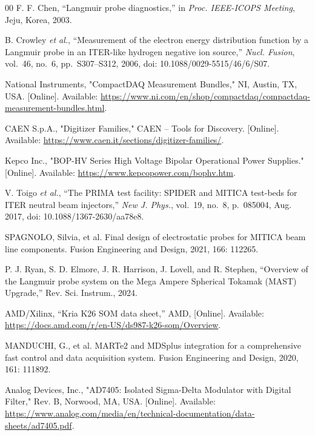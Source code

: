 \begin{thebibliography}{00}
	 F. F. Chen, ``Langmuir probe diagnostics,'' in \textit{Proc. IEEE-ICOPS Meeting}, Jeju, Korea, 2003.
	
	 B. Crowley \textit{et al.}, ``Measurement of the electron energy distribution function by a Langmuir probe in an ITER-like hydrogen negative ion source,'' \textit{Nucl. Fusion}, vol.~46, no.~6, pp.~S307--S312, 2006, doi: 10.1088/0029-5515/46/6/S07.
	
	 National Instruments, "CompactDAQ Measurement Bundles," NI, Austin, TX, USA. [Online]. Available: \url{https://www.ni.com/en/shop/compactdaq/compactdaq-measurement-bundles.html}.
	
	 CAEN S.p.A., "Digitizer Families," CAEN – Tools for Discovery. [Online]. Available: \url{https://www.caen.it/sections/digitizer-families/}. 
	
	 Kepco Inc., "BOP-HV Series High Voltage Bipolar Operational Power Supplies." [Online]. Available: \url{https://www.kepcopower.com/bophv.htm}. 
	
	 V. Toigo \textit{et al.}, ``The PRIMA test facility: SPIDER and MITICA test-beds for ITER neutral beam injectors,'' \textit{New J. Phys.}, vol.~19, no.~8, p.~085004, Aug. 2017, doi: 10.1088/1367-2630/aa78e8.
	
	 SPAGNOLO, Silvia, et al. Final design of electrostatic probes for MITICA beam line components. Fusion Engineering and Design, 2021, 166: 112265.
	
	 P. J. Ryan, S. D. Elmore, J. R. Harrison, J. Lovell, and R. Stephen, “Overview of the Langmuir probe system on the Mega Ampere Spherical Tokamak (MAST) Upgrade,” Rev. Sci. Instrum., 2024.
	
	 AMD/Xilinx, ``Kria K26 SOM data sheet,'' AMD, [Online]. Available: \url{https://docs.amd.com/r/en-US/ds987-k26-som/Overview}. 
	
	 MANDUCHI, G., et al. MARTe2 and MDSplus integration for a comprehensive fast control and data acquisition system. Fusion Engineering and Design, 2020, 161: 111892.
	
	 Analog Devices, Inc., "AD7405: Isolated Sigma-Delta Modulator with Digital Filter," Rev. B, Norwood, MA, USA. [Online]. Available: \url{https://www.analog.com/media/en/technical-documentation/data-sheets/ad7405.pdf}. 
	
\end{thebibliography}